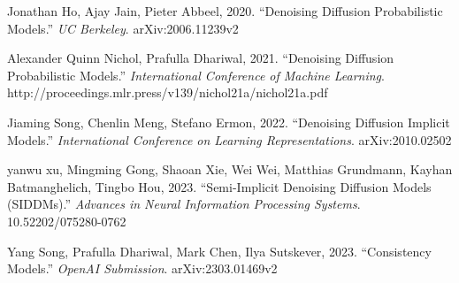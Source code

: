 \documentclass[11pt, letterpaper]{article}
\begin{document}
\begin{enumerate}[label={[\arabic*]},leftmargin=*]
  \item Jonathan Ho, Ajay Jain, Pieter Abbeel, 2020. ``Denoising Diffusion Probabilistic Models.'' \textit{UC Berkeley}. arXiv:2006.11239v2
  \item Alexander Quinn Nichol, Prafulla Dhariwal, 2021. ``Denoising Diffusion Probabilistic Models.'' \textit{International Conference
of Machine Learning}. http://proceedings.mlr.press/v139/nichol21a/nichol21a.pdf
  \item Jiaming Song, Chenlin Meng, Stefano Ermon, 2022. ``Denoising Diffusion Implicit Models.'' \textit{International Conference on Learning Representations}. arXiv:2010.02502
  \item yanwu xu, Mingming Gong, Shaoan Xie, Wei Wei, Matthias Grundmann,
Kayhan Batmanghelich, Tingbo Hou, 2023. ``Semi-Implicit Denoising Diffusion Models (SIDDMs).'' \textit{Advances in Neural Information Processing Systems}. 10.52202/075280-0762
  \item Yang Song, Prafulla Dhariwal, Mark Chen, Ilya Sutskever, 2023. ``Consistency Models.'' \textit{OpenAI Submission}. arXiv:2303.01469v2
\end{enumerate}
\end{document}

